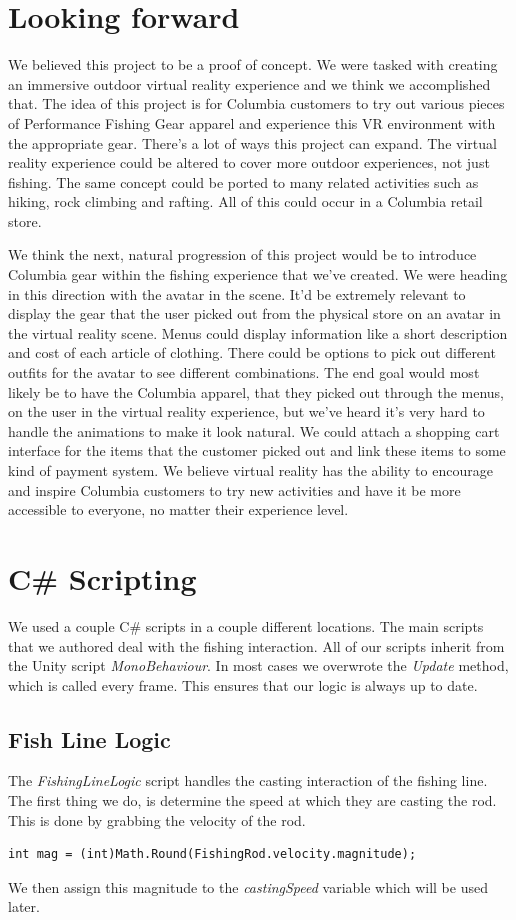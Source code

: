 \documentclass[10pt,journal,compsoc,onecolumn, draftclsnofoot]{IEEEtran}
\begin{document}
\section{Looking forward}
We believed this project to be a proof of concept.
We were tasked with creating an immersive outdoor virtual reality experience and we think we accomplished that.
The idea of this project is for Columbia customers to try out various pieces of Performance Fishing Gear apparel and experience this VR environment with the appropriate gear.
There's a lot of ways this project can expand. The virtual reality experience could be altered to cover more outdoor experiences, not just fishing.
The same concept could be ported to many related activities such as hiking, rock climbing and rafting.
All of this could occur in a Columbia retail store.

We think the next, natural progression of this project would be to introduce Columbia gear within the fishing experience that we've created.
We were heading in this direction with the avatar in the scene.
It'd be extremely relevant to display the gear that the user picked out from the physical store on an avatar in the virtual reality scene.
Menus could display information like a short description and cost of each article of clothing.
There could be options to pick out different outfits for the avatar to see different combinations.
The end goal would most likely be to have the Columbia apparel, that they picked out through the menus, on the user in the virtual reality experience, but we've heard it's very hard to handle the animations to make it look natural.
We could attach a shopping cart interface for the items that the customer picked out and link these items to some kind of payment system.
We believe virtual reality has the ability to encourage and inspire Columbia customers to try new activities and have it be more accessible to everyone, no matter their experience level.


\section{C\# Scripting}
We used a couple C\# scripts in a couple different locations. The main scripts that we authored deal with the fishing interaction. All of our scripts inherit from the Unity script \textit{MonoBehaviour}. In most cases we overwrote the \textit{Update} method, which is called every frame. This ensures that our logic is always up to date.

\subsection{Fish Line Logic}
The \textit{FishingLineLogic} script handles the casting interaction of the fishing line.
The first thing we do, is determine the speed at which they are casting the rod. This is done by grabbing the velocity of the rod.
\begin{lstlisting}[language={[Sharp]C}]
int mag = (int)Math.Round(FishingRod.velocity.magnitude);
\end{lstlisting}
We then assign this magnitude to the \textit{castingSpeed} variable which will be used later.
\end{document}
